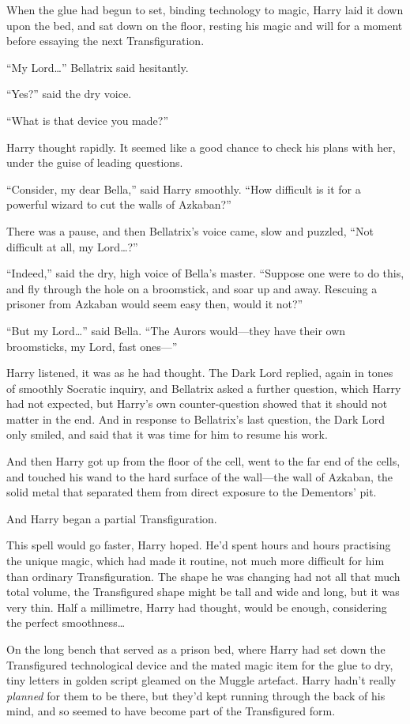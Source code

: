 When the glue had begun to set, binding technology to magic, Harry laid it down upon the bed, and sat down on the floor, resting his magic and will for a moment before essaying the next Transfiguration.

“My Lord…” Bellatrix said hesitantly.

“Yes?” said the dry voice.

“What is that device you made?”

Harry thought rapidly. It seemed like a good chance to check his plans with her, under the guise of leading questions.

“Consider, my dear Bella,” said Harry smoothly.
“How difficult is it for a powerful wizard to cut the walls of Azkaban?”

There was a pause, and then Bellatrix’s voice came, slow and puzzled,
“Not difficult at all, my Lord…?”

“Indeed,” said the dry, high voice of Bella’s master.
“Suppose one were to do this, and fly through the hole on a broomstick, and soar up and away. Rescuing a prisoner from Azkaban would seem easy then, would it not?”

“But my Lord…” said Bella.
“The Aurors would—they have their own broomsticks, my Lord, fast ones—”

Harry listened, it was as he had thought. The Dark Lord replied, again in tones of smoothly Socratic inquiry, and Bellatrix asked a further question, which Harry had not expected, but Harry’s own counter-question showed that it should not matter in the end. And in response to Bellatrix’s last question, the Dark Lord only smiled, and said that it was time for him to resume his work.

And then Harry got up from the floor of the cell, went to the far end of the cells, and touched his wand to the hard surface of the wall—the wall of Azkaban, the solid metal that separated them from direct exposure to the Dementors’ pit.

And Harry began a partial Transfiguration.

This spell would go faster, Harry hoped. He’d spent hours and hours practising the unique magic, which had made it routine, not much more difficult for him than ordinary Transfiguration. The shape he was changing had not all that much total volume, the Transfigured shape might be tall and wide and long, but it was very thin. Half a millimetre, Harry had thought, would be enough, considering the perfect smoothness…

On the long bench that served as a prison bed, where Harry had set down the Transfigured technological device and the mated magic item for the glue to dry, tiny letters in golden script gleamed on the Muggle artefact. Harry hadn’t really \emph{planned} for them to be there, but they’d kept running through the back of his mind, and so seemed to have become part of the Transfigured form.

